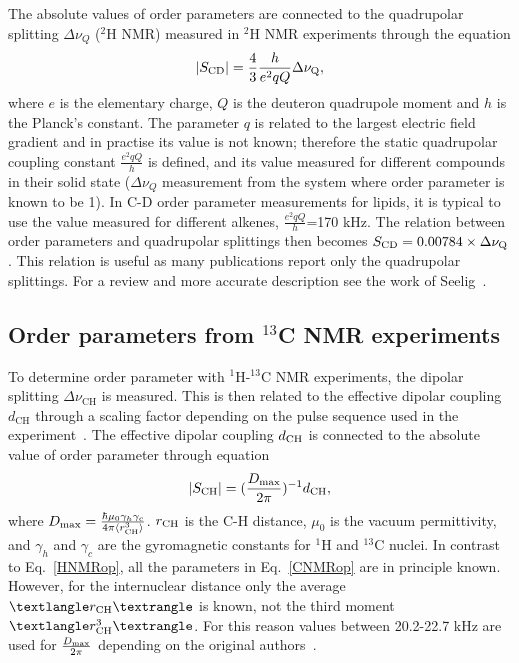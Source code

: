 \documentclass[aps,prl,superscriptaddress,twocolumn]{revtex4}
\begin{document}
The absolute values of order parameters are connected to the quadrupolar splitting $\Delta \nu_Q$ ($^2$H NMR) 
measured in $^2$H NMR experiments through the equation 
\begin{equation}\label{HNMRop}
|S_{{\rm CD}}|=\frac{4}{3} \frac{h}{e^2qQ} \Delta \nu_{{\rm Q}}, 
\end{equation}
where $e$ is the elementary charge, $Q$ is the deuteron quadrupole moment and $h$ is the Planck's constant. 
The parameter $q$ is related to the largest electric field gradient and in practise its value is not known; 
therefore the static quadrupolar coupling constant $\frac{e^2qQ}{h}$ is defined, and its value measured for 
different compounds in their solid state ($\Delta \nu_Q$ measurement from the system where order parameter is known to be 1). 
In C-D order parameter measurements for lipids, it is typical to 
use the value measured for different alkenes, $\frac{e^2qQ}{h}$=170 kHz. The relation between order parameters 
and quadrupolar splittings then becomes $S_{{\rm CD}}=0.00784 \times \Delta \nu_{{\rm Q}}$.
This relation is useful as many publications report only the quadrupolar splittings. For a review and more accurate description see the work of Seelig~\cite{seelig77c}.

\subsection{Order parameters from $^{13}$C NMR experiments}

To determine order parameter with $^1$H-$^{13}$C NMR experiments, the dipolar splitting $\Delta \nu_\mathrm{CH}$  is measured. This is then related to
the effective dipolar coupling $d_\mathrm{CH}$ through a scaling factor depending on the pulse sequence used in the 
experiment~\cite{hong95a,gross97,dvinskikh05a,ferreira13}. The effective dipolar coupling $d_{{\rm CH}}$ is 
connected to the absolute value of order parameter through equation
\begin{equation}\label{CNMRop}
|S_{{\rm CH}}|=(\frac{D_{{\rm max}}}{2\pi})^{-1}d_\mathrm{CH},
\end{equation}
where $D_{{\rm max}} = \frac{\hbar \mu_0 \gamma_h \gamma_c}{4\pi\langle r_\mathrm{CH}^3 \rangle}$. 
$r_{{\rm CH}}$ is the C-H distance, $\mu_0$ is the vacuum permittivity, and $\gamma_h$ and $\gamma_c$ are 
the gyromagnetic constants for $^1$H and $^{13}$C nuclei. In contrast to Eq.~\ref{HNMRop}, all the parameters in 
Eq.~\ref{CNMRop} are in principle known. However, for the internuclear distance only the average $⟨r_{{\rm CH}}⟩$ 
is known, not the third moment $⟨r^3_{{\rm CH}}⟩$. For this reason values between 20.2-22.7 kHz are used for
$\frac{D_{{\rm max}}}{2\pi}$ depending on the original authors~\cite{hong95a,gross97,dvinskikh05a,becker06,ferreira13,ferreira15}.
\end{document}
